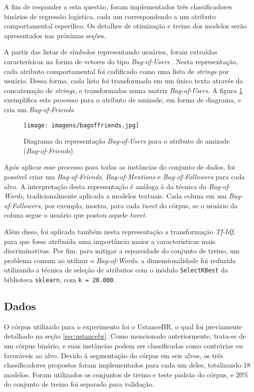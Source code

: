 \documentclass[
	12pt, oneside, a4paper, english, brazil
]{abntex2ppgsi}
\begin{document}
A fim de responder a esta questão, foram implementados três classificadores binários de regressão logística, cada um correspondendo a um atributo comportamental específico. Os detalhes de otimização e treino dos modelos serão apresentados nas próximas seções.

A partir das listas de símbolos representando usuários, foram extraídas caracterísicas na forma de vetores do tipo {\em Bag-of-Users} \cite{bagofusers}. Nesta representação, cada atributo comportamental foi codificado como uma lista de {\em strings} por usuário. Dessa forma, cada lista foi transformada em um único texto através da concatenação de {\em strings}, e transformadas numa matriz {\em Bag-of-Users}. A figura \ref{fig:bagoffriends} exemplifica este processo para o atributo de amizade, em forma de diagrama, e cria um {\em Bag-of-Friends}.

\begin{figure}[H]
	\centering
 	  \caption{Diagrama da representação {\em Bag-of-Users} para o atributo de amizade ({\em Bag-of-Friends})}
	\texttt{[image: imagens/bagoffriends.jpg]}
	\label{fig:bagoffriends}
\end{figure}

Após aplicar esse processo para todas as instâncias do conjunto de dados, foi possível criar um {\em Bag-of-Friends}, {\em Bag-of-Mentions} e {\em Bag-of-Followers} para cada alvo. A interpretação desta representação é análoga à da técnica do {\em Bag-of-Words}, tradicionalmente aplicada a modelos textuais. Cada coluna em um {\em Bag-of-Followers}, por exemplo, mostra, para cada {\em tweet} do córpus, se o usuário da coluna segue o usuário que postou aquele {\em tweet}. 

Além disso, foi aplicada também nesta representação a transformação {\em Tf-Idf}, para que fosse atribuída uma importância maior a características mais discriminativas. Por fim, para mitigar a esparsidade do conjunto de treino, um problema comum ao utilizar o {\em Bag-of-Words}, a dimensionalidade foi reduzida utilizando a técnica de seleção de atributos com o módulo \texttt{SelectKBest} da biblioteca \texttt{sklearn}, com \texttt{k = 20.000}.

\subsection{Dados}
\label{sec:dados}
O córpus utilizado para o experimento foi o UstanceBR, o qual foi previamente detalhado na seção \ref{sec:ustancebr}. Como mencionado anteriormente, trata-se de um córpus binário, e suas instâncias podem ser classificadas como contrárias ou favoráveis ao alvo. Devido à segmentação do córpus em seis alvos, os três classificadores propostos foram implementados para cada um deles, totalizando 18 modelos. Foram utilizados os conjuntos de treino e teste padrão do córpus, e 20\% do conjunto de treino foi separado para validação.
\end{document}
